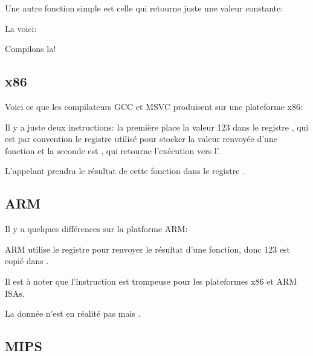 ﻿
\label{ret_val_func}

Une autre fonction simple est celle qui retourne juste une valeur constante:

La voici:



Compilons la!

\subsection{x86}

Voici ce que les compilateurs GCC et MSVC produisent sur une plateforme x86:



Il y a juste deux instructions: la première place la valeur 123 dans le registre \EAX, qui est par convention le registre utilisé pour stocker la valeur renvoyée d'une fonction et la seconde est \RET, qui retourne l'exécution vers l'.

L'appelant prendra le résultat de cette fonction dans le registre \EAX.

\subsection{ARM}

Il y a quelques différences sur la platforme ARM:



ARM utilise le registre  pour renvoyer le résultat d'une fonction, donc 123 est copié dans .


Il est à noter que l'instruction \MOV est trompeuse pour les plateformes x86 et ARM \ac{ISA}s.

La donnée n'est en réalité pas  mais .

\subsection{MIPS}

\label{MIPS_leaf_function_ex1}

